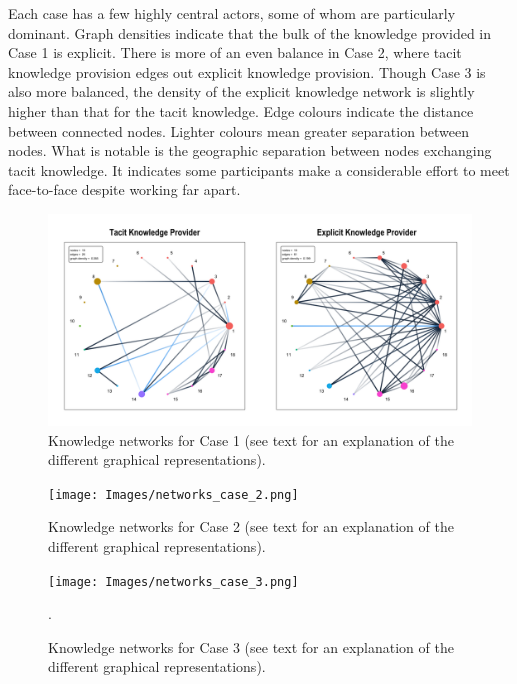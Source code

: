 Each case has a few highly central actors, some of whom are particularly dominant. Graph densities indicate that the bulk of the knowledge provided in Case 1 is explicit. There is more of an even balance in Case 2, where tacit knowledge provision edges out explicit knowledge provision. Though Case 3 is also more balanced, the density of the explicit knowledge network is slightly higher than that for the tacit knowledge. Edge colours indicate the distance between connected nodes. Lighter colours mean greater separation between nodes. What is notable is the geographic separation between nodes exchanging tacit knowledge. It indicates some participants make a considerable effort to meet face-to-face despite working far apart. \medskip

\begin{figure}
\includegraphics[width=1\linewidth]{Images/networks_case_1.png}
\caption[Knowledge networks for Case 1]{Knowledge networks for Case 1 (see text for an explanation of the different graphical representations).}
\label{fig:network_case_1} 
\end{figure}

\begin{figure}
\texttt{[image: Images/networks\_case\_2.png]}
\caption[Knowledge networks for Case 2]{Knowledge networks for Case 2 (see text for an explanation of the different graphical representations).}
\label{fig:network_case_2} 
\end{figure}

\begin{figure}
\texttt{[image: Images/networks\_case\_3.png]}
\caption[Knowledge networks for Case 3]{Knowledge networks for Case 3 (see text for an explanation of the different graphical representations).}. 
\label{fig:network_case_3} 
\end{figure}

